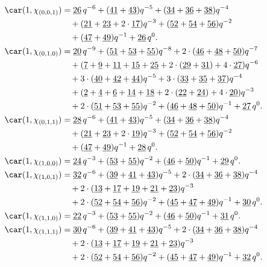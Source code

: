 \begin{align*}
	\car(1,\chi_{(0,0,1)})
	&=\underline{26}\,q^{-6}+(\underline{41}+\underline{43})q^{-5}+(\underline{34}+\underline{36}+\underline{38})q^{-4}\\
	&\quad+(\underline{21}+\underline{23}+2\cdot\underline{17})q^{-3}+(\underline{52}+\underline{54}+\underline{56})q^{-2}\\
	&\quad+(\underline{47}+\underline{49})q^{-1}+\underline{26}\,q^0.\\
	\car(1,\chi_{(0,1,0)})
	&=\underline{20}\,q^{-9}+(\underline{51}+\underline{53}+\underline{55})q^{-8}+2\cdot(\underline{46}+\underline{48}+\underline{50})q^{-7}\\
	&\quad+(\underline{7}+\underline{9}+\underline{11}+\underline{15}+\underline{25}+2\cdot(\underline{29}+\underline{31})+4\cdot\underline{27})q^{-6}\\
	&\quad+3\cdot(\underline{40}+\underline{42}+\underline{44})q^{-5}+3\cdot(\underline{33}+\underline{35}+\underline{37})q^{-4}\\
	&\quad+(\underline{2}+\underline{4}+\underline{6}+\underline{14}+\underline{18}+2\cdot(\underline{22}+\underline{24})+4\cdot\underline{20})q^{-3}\\
	&\quad+2\cdot(\underline{51}+\underline{53}+\underline{55})q^{-2}+(\underline{46}+\underline{48}+\underline{50})q^{-1}+\underline{27}\,q^0.\\
	\car(1,\chi_{(0,1,1)})
	&=\underline{28}\,q^{-6}+(\underline{41}+\underline{43})q^{-5}+(\underline{34}+\underline{36}+\underline{38})q^{-4}\\
	&\quad+(\underline{21}+\underline{23}+2\cdot\underline{19})q^{-3}+(\underline{52}+\underline{54}+\underline{56})q^{-2}\\
	&\quad+(\underline{47}+\underline{49})q^{-1}+\underline{28}\,q^0.\\
	\car(1,\chi_{(1,0,0)})
	&=\underline{24}\,q^{-3}+(\underline{53}+\underline{55})q^{-2}+(\underline{46}+\underline{50})q^{-1}+\underline{29}\,q^0.\\
	\car(1,\chi_{(1,0,1)})
	&=\underline{32}\,q^{-6}+(\underline{39}+\underline{41}+\underline{43})q^{-5}+2\cdot(\underline{34}+\underline{36}+\underline{38})q^{-4}\\
	&\quad+2\cdot(\underline{13}+\underline{17}+\underline{19}+\underline{21}+\underline{23})q^{-3}\\
	&\quad+2\cdot(\underline{52}+\underline{54}+\underline{56})q^{-2}+(\underline{45}+\underline{47}+\underline{49})q^{-1}+\underline{30}\,q^0.\\
	\car(1,\chi_{(1,1,0)})
	&=\underline{22}\,q^{-3}+(\underline{53}+\underline{55})q^{-2}+(\underline{46}+\underline{50})q^{-1}+\underline{31}\,q^0.\\
	\car(1,\chi_{(1,1,1)})
	&=\underline{30}\,q^{-6}+(\underline{39}+\underline{41}+\underline{43})q^{-5}+2\cdot(\underline{34}+\underline{36}+\underline{38})q^{-4}\\
	&\quad+2\cdot(\underline{13}+\underline{17}+\underline{19}+\underline{21}+\underline{23})q^{-3}\\
	&\quad+2\cdot(\underline{52}+\underline{54}+\underline{56})q^{-2}+(\underline{45}+\underline{47}+\underline{49})q^{-1}+\underline{32}\,q^0.
\end{align*}


